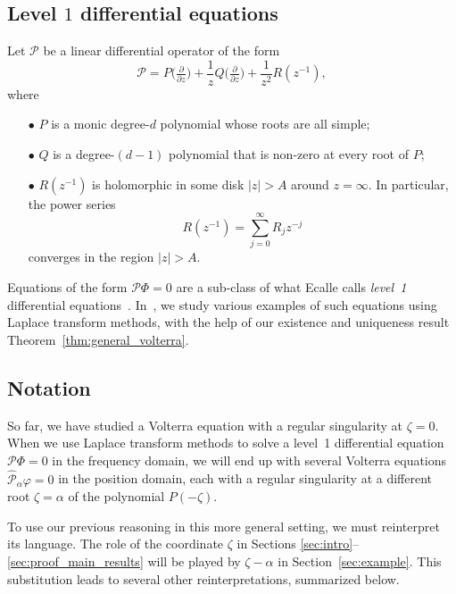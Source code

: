 \documentclass{article}
\theoremstyle{definition}
\theoremstyle{plain}
\begin{document}
\subsection{Level $1$ differential equations}\label{sec:level 1 ODE}
Let $\mathcal{P}$ be a linear differential operator of the form
\[ \mathcal{P} = P\big(\tfrac{\partial}{\partial z}\big) + \frac{1}{z} Q\big(\tfrac{\partial}{\partial z}\big) + \frac{1}{z^2} R(z^{-1}), \]
where
\begin{enumerate}
\item[$\bullet$] $P$ is a monic degree-$d$ polynomial whose roots are all simple; 
\item[$\bullet$] $Q$ is a degree-$(d-1)$ polynomial that is non-zero at every root of $P$;
\item[$\bullet$] $R(z^{-1})$ is holomorphic in some disk $|z| > A$ around $z = \infty$. In particular, the power series
\[ R(z^{-1}) = \sum_{j=0}^\infty R_j z^{-j} \]
converges in the region $|z| > A$.
\end{enumerate}
Equations of the form $\mathcal{P}\Phi = 0$ are a sub-class of what Ecalle calls {\em level~1} differential equations~\cite[Section~2.1]{EcalleIII}\cite[Section~5.2.2.1]{diverg-resurg-iii}. In~\cite{borel_reg}, we study various examples of such equations using Laplace transform methods, with the help of our existence and uniqueness result Theorem~\ref{thm:general_volterra}. 
\subsection{Notation}\label{sec:notation_alpha}
So far, we have studied a Volterra equation with a regular singularity at $\zeta = 0$. When we use Laplace transform methods to solve a level~1 differential equation $\mathcal{P}\Phi = 0$ in the frequency domain, we will end up with several Volterra equations $\hat{\mathcal{P}}_\alpha \varphi = 0$ in the position domain, each with a regular singularity at a different root $\zeta = \alpha$ of the polynomial $P(-\zeta)$.

To use our previous reasoning in this more general setting, we must reinterpret its language. The role of the coordinate $\zeta$ in Sections \ref{sec:intro}--\ref{sec:proof_main_results} will be played by $\zeta-\alpha$ in Section~\ref{sec:example}. This substitution leads to several other reinterpretations, summarized below.
\end{document}
